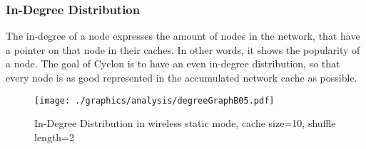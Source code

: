\subsubsection{In-Degree Distribution}
\label{subsubsec:inDegree}
The in-degree of a node expresses the amount of nodes in the network, that
have a pointer on that node in their caches. In other words, it shows the
popularity of a node. The goal of Cyclon is to have an even in-degree distribution, so that
every node is as good represented in the accumulated network cache as
possible.

\begin{figure}
	\texttt{[image: ./graphics/analysis/degreeGraphB05.pdf]}
	\caption{In-Degree Distribution in wireless static mode, cache size=10, shuffle
	length=2}
	\label{fig:inDegreeDistB05}
\end{figure}

